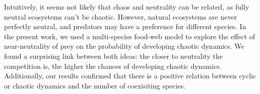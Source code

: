 Intuitively, it seems not likely that chaos and neutrality can be related, as fully neutral ecosystems can't be chaotic. However, natural ecosystems are never perfectly neutral, and predators may have a preference for different species. In the present work, we used a multi-species food-web model to explore the effect of near-neutrality of prey on the probability of developing chaotic dynamics. We found a surprising link between both ideas: the closer to neutrality the competition is, the higher the chances of developing chaotic dynamics. Additionally, our results confirmed that there is a positive relation between cyclic or chaotic dynamics and the number of coexisiting species.
